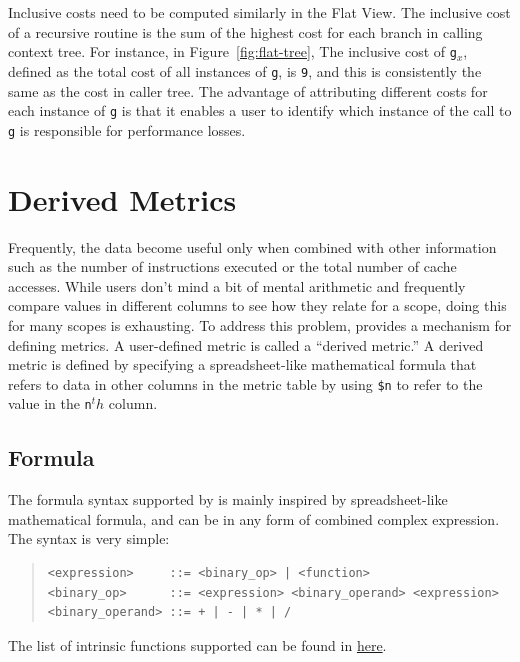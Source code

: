 Inclusive costs need to be computed similarly in the Flat View. The inclusive cost of a recursive routine is the sum of the highest cost for each branch in calling context tree. For instance, in Figure~\ref{fig:flat-tree}, The inclusive cost of \texttt{g$_x$}, defined as the total cost of all instances of \texttt{g}, is \texttt{9}, and this is consistently the same as the cost in caller tree. The advantage of attributing different costs for each instance of \texttt{g} is that it enables a user to identify which instance of the call to \texttt{g} is responsible for performance losses.



\section{Derived Metrics}

Frequently, the data become useful only when combined with other information such as the number of instructions executed or the total number of cache accesses.
While users don't mind a bit of mental arithmetic and frequently compare values in different columns to see how they relate for a scope, doing this for many scopes is exhausting.
To address this problem, \hpcviewer{} provides a mechanism for defining metrics.
A user-defined metric is called a ``derived metric.''
A derived metric is defined by specifying a spreadsheet-like mathematical formula that refers to data in other columns in the metric table by using \texttt{\$n} to refer to the value in the \texttt{n}$^th$ column.


\subsection{Formula}

The formula syntax supported by \hpcviewer{} is mainly inspired by spreadsheet-like mathematical formula, and can be in any form of combined complex expression.
The syntax is very simple:
\begin{quote}
\begin{verbatim}
<expression>     ::= <binary_op> | <function>
<binary_op>      ::= <expression> <binary_operand> <expression>
<binary_operand> ::= + | - | * | /
\end{verbatim}
\end{quote}
%
The list of intrinsic functions supported can be found in \href{functions.html}{here}.

